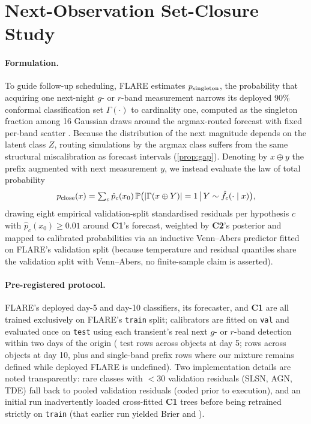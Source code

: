 \FloatBarrier
\section{Next-Observation Set-Closure Study}
\label{app:closure}
\paragraph{Formulation.}
To guide follow-up scheduling, FLARE estimates $p_{\rm singleton}$, the probability that acquiring one next-night $g$- or $r$-band measurement narrows its deployed 90\% conformal classification set $\Gamma(\cdot)$ to cardinality one, computed as the singleton fraction among 16 Gaussian draws around the argmax-routed forecast with fixed per-band scatter \citep{sasli2026forecast}.
Because the distribution of the next magnitude depends on the latent class $Z$, routing simulations by the argmax class suffers from the same structural miscalibration as forecast intervals (\cref{prop:gap}).
Denoting by $x\oplus y$ the prefix augmented with next measurement $y$, we instead evaluate the law of total probability
\[
p_{\rm close}(x)=\textstyle\sum_c \hat p_c(x_0)\,\P\big(|\Gamma(x\oplus Y)|=1 \,\big|\, Y\sim\hat f_c(\cdot\mid x)\big),
\]
drawing eight empirical validation-split standardised residuals per hypothesis $c$ with $\hat p_c(x_0)\ge0.01$ around \textbf{C1}'s forecast, weighted by \textbf{C2}'s posterior and mapped to calibrated probabilities via an inductive Venn--Abers predictor \citep{vovk2014venn} fitted on FLARE's validation split (because temperature and residual quantiles share the validation split with Venn--Abers, no finite-sample claim is asserted).

\paragraph{Pre-registered protocol.}
FLARE's deployed day-5 and day-10 classifiers, its forecaster, and \textbf{C1} are all trained exclusively on FLARE's \texttt{train} split; calibrators are fitted on \texttt{val} and evaluated once on \texttt{test} using each transient's real next $g$- or $r$-band detection within two days of the origin (\CloFiveN{} test rows across \CloFiveNObj{} objects at day 5; \CloTenN{} rows across \CloTenNObj{} objects at day 10, plus \CloFiveUndef{} and \CloTenUndef{} single-band prefix rows where our mixture remains defined while deployed FLARE is undefined).
Two implementation details are noted transparently: rare classes with $<30$ validation residuals (SLSN, AGN, TDE) fall back to pooled validation residuals (coded prior to execution), and an initial run inadvertently loaded cross-fitted \textbf{C1} trees before being retrained strictly on \texttt{train} (that earlier run yielded Brier \CloFiveBrierCrossfit{} and \CloTenBrierCrossfit{}).

